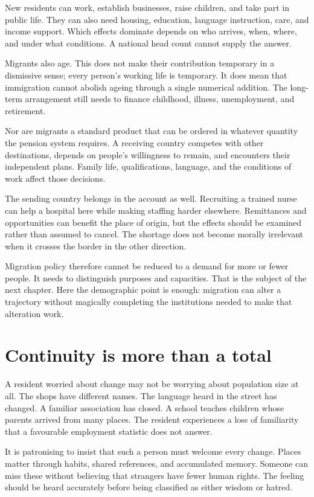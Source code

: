 \documentclass[12pt,a4paper]{book}
\begin{document}
New residents can work, establish businesses, raise children, and take part in public life. They can also need housing, education, language instruction, care, and income support. Which effects dominate depends on who arrives, when, where, and under what conditions. A national head count cannot supply the answer.

Migrants also age. This does not make their contribution temporary in a dismissive sense; every person's working life is temporary. It does mean that immigration cannot abolish ageing through a single numerical addition. The long-term arrangement still needs to finance childhood, illness, unemployment, and retirement.

Nor are migrants a standard product that can be ordered in whatever quantity the pension system requires. A receiving country competes with other destinations, depends on people's willingness to remain, and encounters their independent plans. Family life, qualifications, language, and the conditions of work affect those decisions.

The sending country belongs in the account as well. Recruiting a trained nurse can help a hospital here while making staffing harder elsewhere. Remittances and opportunities can benefit the place of origin, but the effects should be examined rather than assumed to cancel. The shortage does not become morally irrelevant when it crosses the border in the other direction.

Migration policy therefore cannot be reduced to a demand for more or fewer people. It needs to distinguish purposes and capacities. That is the subject of the next chapter. Here the demographic point is enough: migration can alter a trajectory without magically completing the institutions needed to make that alteration work.

\section*{Continuity is more than a total}

A resident worried about change may not be worrying about population size at all. The shops have different names. The language heard in the street has changed. A familiar association has closed. A school teaches children whose parents arrived from many places. The resident experiences a loss of familiarity that a favourable employment statistic does not answer.

It is patronising to insist that such a person must welcome every change. Places matter through habits, shared references, and accumulated memory. Someone can miss these without believing that strangers have fewer human rights. The feeling should be heard accurately before being classified as either wisdom or hatred.
\end{document}
